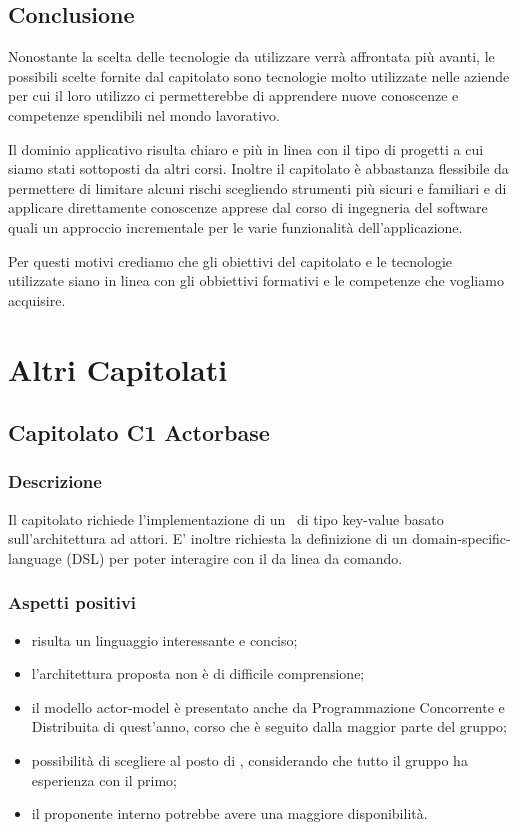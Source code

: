 \documentclass[12pt,a4paper]{article}
\begin{document}
\subsection{Conclusione}

Nonostante la scelta delle tecnologie da utilizzare verrà affrontata più avanti, le possibili scelte fornite dal capitolato sono tecnologie molto utilizzate nelle aziende per cui il loro utilizzo ci permetterebbe di apprendere nuove conoscenze e competenze spendibili nel mondo lavorativo.

Il dominio applicativo risulta chiaro e più in linea con il tipo di progetti a cui siamo stati sottoposti da altri corsi. Inoltre il capitolato è abbastanza flessibile da permettere di limitare alcuni rischi scegliendo strumenti più sicuri e familiari e di applicare direttamente conoscenze apprese dal corso di ingegneria del software quali un approccio incrementale per le varie funzionalità dell'applicazione.

Per questi motivi crediamo che gli obiettivi del capitolato e le tecnologie utilizzate siano in linea con gli obbiettivi formativi e le competenze che vogliamo acquisire.

\newpage
\section{Altri Capitolati}

\subsection{Capitolato C1 Actorbase}
\subsubsection{Descrizione}

Il capitolato richiede l'implementazione di un  \ di tipo key-value basato sull'architettura ad attori. E' inoltre richiesta la definizione di un domain-specific-language (DSL) per poter interagire con il  da linea da comando.

\subsubsection{Aspetti positivi}
\begin{itemize}
\item {} risulta un linguaggio interessante e conciso;
\item l'architettura proposta non è di difficile comprensione;
\item il modello actor-model è presentato anche da Programmazione Concorrente e Distribuita di quest'anno, corso che è seguito dalla maggior parte del gruppo;
\item possibilità di scegliere  al posto di , considerando che tutto il gruppo ha esperienza con il primo;
\item il proponente interno potrebbe avere una maggiore disponibilità.
\end{itemize}
\end{document}
